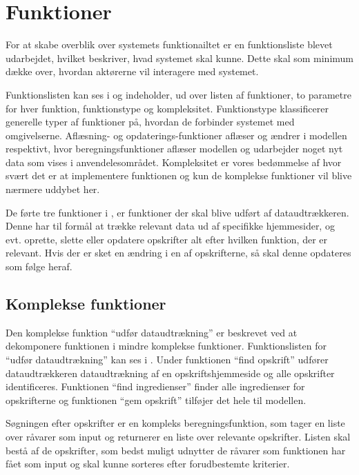\section{Funktioner}
\label{sec:funktioner}

For at skabe overblik over systemets funktionailtet er en funktionsliste  blevet udarbejdet, hvilket beskriver, hvad systemet skal kunne. Dette skal som minimum dække over, hvordan aktørerne vil interagere med systemet.

Funktionslisten kan ses i  og indeholder, ud over listen af funktioner, to parametre for hver funktion, funktionstype og kompleksitet. Funktionstype klassificerer generelle typer af funktioner på, hvordan de forbinder systemet med omgivelserne. Aflæsning- og opdaterings-funktioner aflæser og ændrer i modellen respektivt, hvor beregningsfunktioner aflæser modellen og udarbejder noget nyt data som vises i anvendelesområdet. Kompleksitet er vores bedømmelse af hvor svært det er at implementere funktionen og kun de komplekse funktioner vil blive nærmere uddybet her.



De førte tre funktioner i , er funktioner der skal blive udført af dataudtrækkeren. Denne har til formål at trække relevant data ud af specifikke hjemmesider, og evt. oprette, slette eller opdatere opskrifter alt efter hvilken funktion, der er relevant. Hvis der \fx er sket en ændring i en af opskrifterne, så skal denne opdateres som følge heraf. 

\subsection{Komplekse funktioner}
Den komplekse funktion ``udfør dataudtrækning'' er beskrevet ved at dekomponere funktionen i mindre komplekse funktioner. Funktionslisten for ``udfør dataudtrækning'' kan ses i . Under funktionen ``find opskrift'' udfører dataudtrækkeren dataudtrækning af en opskriftshjemmeside og alle opskrifter identificeres. Funktionen ``find ingredienser'' finder alle ingredienser for opskrifterne og funktionen ``gem opskrift'' tilføjer det hele til modellen.

Søgningen efter opskrifter er en kompleks beregningsfunktion, som tager en liste over råvarer som input og returnerer en liste over relevante opskrifter. Listen skal bestå af de opskrifter, som bedst muligt udnytter de råvarer som funktionen har fået som input og skal kunne sorteres efter forudbestemte kriterier.
